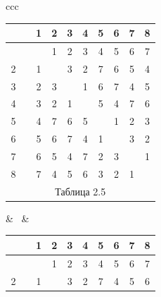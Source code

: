 \begin{center}





\begin{tabular}{ccc}





\begin{tabular}{cccccccccc}


\ & \vline & 1 & 2 & 3 & 4 & 5 & 6 & 7 & 8 \\


\hline


 1 & \vline & \ & 1 & 2 & 3 & 4 & 5 & 6 & 7 \\


2 & \vline & 1 & \ & 3 & 2 & 7 & 6 & 5 & 4 \\


3 & \vline & 2 & 3 & \ & 1 & 6 & 7 & 4 & 5 \\


4 & \vline & 3 & 2 & 1 & \ & 5 & 4 & 7 & 6 \\


5 & \vline & 4 & 7 & 6 & 5 & \ & 1 & 2 & 3 \\


6 & \vline & 5 & 6 & 7 & 4 & 1 & \ & 3 & 2 \\


7 & \vline & 6 & 5 & 4 & 7 & 2 & 3 & \ & 1 \\


8 & \vline & 7 & 4 & 5 & 6 & 3 & 2 & 1 & \ \\


\multicolumn{10}{c}{ Таблица 2.5}


\end{tabular}





& \ & 





\begin{tabular}{cccccccccc}


\ & \vline & 1 & 2 & 3 & 4 & 5 & 6 & 7 & 8 \\


\hline


 1 & \vline & \ & 1 & 2 & 3 & 4 & 5 & 6 & 7 \\


2 & \vline & 1 & \ & 3 & 2 & 7 & 4 & 5 & 6 \\



\end{tabular}
\end{tabular}
\end{center}
